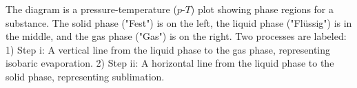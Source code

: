 The diagram is a pressure-temperature (\( p \)-\( T \)) plot showing phase regions for a substance. The solid phase ("Fest") is on the left, the liquid phase ("Flüssig") is in the middle, and the gas phase ("Gas") is on the right. Two processes are labeled:  
1) Step i: A vertical line from the liquid phase to the gas phase, representing isobaric evaporation.  
2) Step ii: A horizontal line from the liquid phase to the solid phase, representing sublimation.